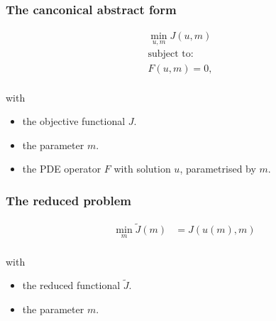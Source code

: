 \begin{frame}
\frametitle{The canconical abstract form}
  \begin{equation*}
    \begin{split}
        \min_{u, m} J(u, m) \\
        \textrm{subject to: } & \\
        F(u, m) = 0, \\
    \end{split}
  \end{equation*}

  with
  \begin{itemize}
  \item the objective functional $J$.
  \item the parameter $m$.
  \item the PDE operator $F$ with solution $u$, parametrised by $m$.
  \end{itemize}
\end{frame}

\begin{frame}
\frametitle{The reduced problem}
  \begin{equation*}
    \begin{split}
        \min_{m} \tilde J(m) &= J(u(m), m) \\
    \end{split}
  \end{equation*}

  with
  \begin{itemize}
  \item the reduced functional $\tilde J$.
  \item the parameter $m$.
  \end{itemize}

\end{frame}

